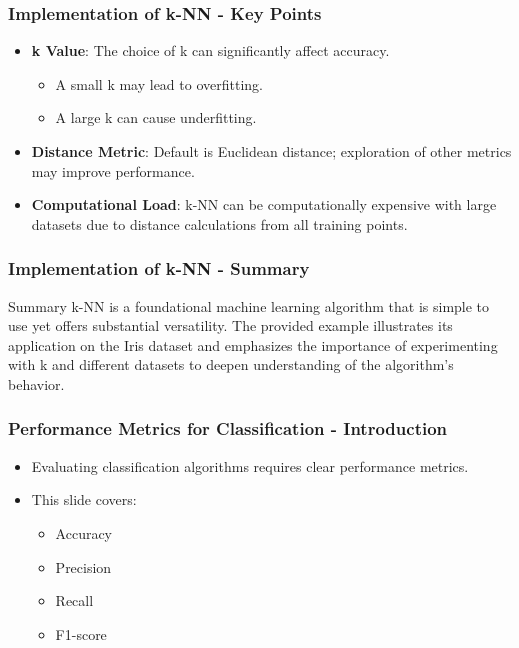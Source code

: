 \documentclass[aspectratio=169]{beamer}
\begin{document}
\begin{frame}[fragile]
    \frametitle{Implementation of k-NN - Key Points}
    \begin{itemize}
        \item \textbf{k Value}: The choice of k can significantly affect accuracy.
        \begin{itemize}
            \item A small k may lead to overfitting.
            \item A large k can cause underfitting.
        \end{itemize}
        
        \item \textbf{Distance Metric}: Default is Euclidean distance; exploration of other metrics may improve performance.
        
        \item \textbf{Computational Load}: k-NN can be computationally expensive with large datasets due to distance calculations from all training points.
    \end{itemize}
\end{frame}

\begin{frame}
    \frametitle{Implementation of k-NN - Summary}
    \begin{block}{Summary}
        k-NN is a foundational machine learning algorithm that is simple to use yet offers substantial versatility. The provided example illustrates its application on the Iris dataset and emphasizes the importance of experimenting with k and different datasets to deepen understanding of the algorithm's behavior.
    \end{block}
\end{frame}

\begin{frame}[fragile]
    \frametitle{Performance Metrics for Classification - Introduction}
    \begin{itemize}
        \item Evaluating classification algorithms requires clear performance metrics.
        \item This slide covers:
        \begin{itemize}
            \item Accuracy
            \item Precision
            \item Recall
            \item F1-score
        \end{itemize}
    \end{itemize}
\end{frame}
\end{document}
